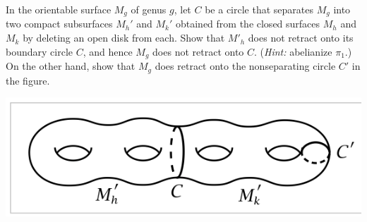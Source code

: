 \documentclass[12pt]{article}
\begin{document}
\begin{problem}{2}
    In the orientable surface $M_g$ of genus $g$, let $C$ be a circle that separates $M_g$ into two compact subsurfaces $M_h'$ and $M_k'$ obtained from the closed surfaces $M_h$ and $M_k$ by deleting an open disk from each. Show that $M'_h$ does not retract onto its boundary circle $C$, and hence $M_g$ does not retract onto $C$. (\emph{Hint:} abelianize $\pi_1$.) On the other hand, show that $M_g$ does retract onto the nonseparating circle $C'$ in the figure. 
    \begin{center}
        \includegraphics{HW5Image.png}
    \end{center}
\end{problem}
\end{document}
